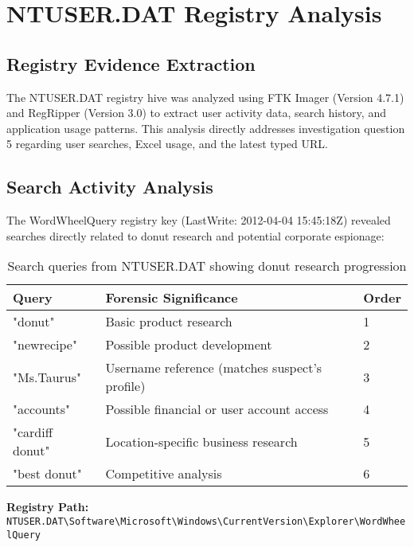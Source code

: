 \chapter{NTUSER.DAT Registry Analysis}

\section{Registry Evidence Extraction}
The NTUSER.DAT registry hive was analyzed using FTK Imager (Version 4.7.1) and RegRipper (Version 3.0) to extract user activity data, search history, and application usage patterns. This analysis directly addresses investigation question 5 regarding user searches, Excel usage, and the latest typed URL.

\section{Search Activity Analysis}
The WordWheelQuery registry key (LastWrite: 2012-04-04 15:45:18Z) revealed searches directly related to donut research and potential corporate espionage:

\begin{table}[htbp]
    \centering
    \begin{tabular}{|l|p{10cm}|l|}
        \hline
        \textbf{Query} & \textbf{Forensic Significance} & \textbf{Order} \\
        \hline
        "donut" & Basic product research & 1 \\
        \hline
        "newrecipe" & Possible product development & 2 \\
        \hline
        "Ms.Taurus" & Username reference (matches suspect's profile) & 3 \\
        \hline
        "accounts" & Possible financial or user account access & 4 \\
        \hline
        "cardiff donut" & Location-specific business research & 5 \\
        \hline
        "best donut" & Competitive analysis & 6 \\
        \hline
    \end{tabular}
    \caption{Search queries from NTUSER.DAT showing donut research progression}
    \label{tab:search_queries}
\end{table}

\textbf{Registry Path:} \texttt{NTUSER.DAT\textbackslash Software\textbackslash Microsoft\textbackslash Windows\textbackslash CurrentVersion\textbackslash Explorer\textbackslash WordWheelQuery}


